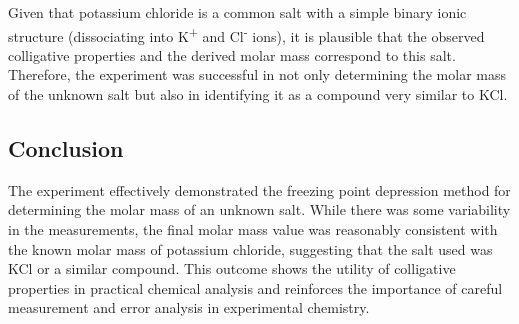\documentclass[a4paper,12pt]{article}
\begin{document}
Given that potassium chloride is a common salt with a simple binary ionic structure (dissociating into K\textsuperscript{+} and Cl\textsuperscript{-} ions), it is plausible that the observed colligative properties and the derived molar mass correspond to this salt. Therefore, the experiment was successful in not only determining the molar mass of the unknown salt but also in identifying it as a compound very similar to KCl.

\subsection{Conclusion}
The experiment effectively demonstrated the freezing point depression method for determining the molar mass of an unknown salt. While there was some variability in the measurements, the final molar mass value was reasonably consistent with the known molar mass of potassium chloride, suggesting that the salt used was KCl or a similar compound. This outcome shows the utility of colligative properties in practical chemical analysis and reinforces the importance of careful measurement and error analysis in experimental chemistry.
\end{document}
